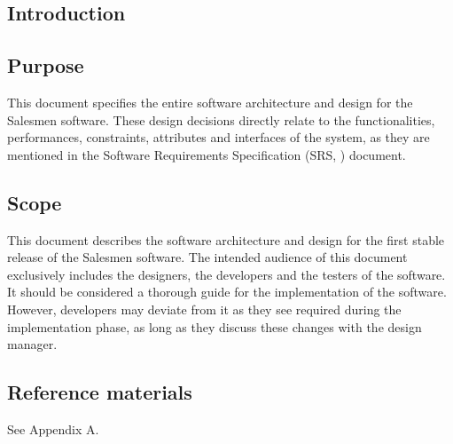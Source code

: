 \documentclass[salesmen, twoside]{../../../templates/latex/2009/softproj}
\begin{document}
\begin{projdoc}

\chapter{Introduction}

\section{Purpose}
This document specifies the entire software architecture and design for the Salesmen software. These design decisions directly relate to the functionalities, performances, constraints, attributes and interfaces of the system, as they are mentioned in the Software Requirements Specification (SRS, \cite{SRS}) document.

\section{Scope}
This document describes the software architecture and design for the first stable release of the Salesmen software. The intended audience of this document exclusively includes the designers, the developers and the testers of the software.\\
It should be considered a thorough guide for the implementation of the software. However, developers may deviate from it as they see required during the implementation phase, as long as they discuss these changes with the design manager. 

\section{Reference materials}
See Appendix A.


\end{projdoc}
\end{document}
